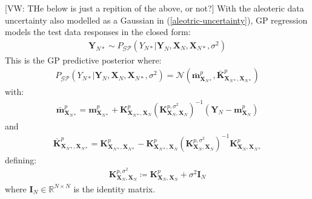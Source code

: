 \documentclass{article}
\newcommand{\vw}[1]{{\color{green} [VW: #1]}}
\newcommand{\GP}{\operatorname{\mathcal{GP}}}
\numberwithin{equation}{section}
\begin{document}
\vw{THe below is just a repition of the above, or not?}
With the aleoteric data uncertainty also modelled as a Gaussian in (\ref{aleotric-uncertainty}), GP regression models the test data responses in the closed form:
\begin{align}
    \mathbf{Y}_{N*} \sim P_{\GP}\left(Y_{N*} \vert \mathbf{Y}_N, \mathbf{X}_N, \mathbf{X}_{N*}, \sigma^2\right)
    \label{gp-posterior}
\end{align}
This is the GP predictive posterior where:
\begin{align}
    P_{\GP}\left(Y_{N*} \vert \mathbf{Y}_N, \mathbf{X}_N, \mathbf{X}_{N*}, \sigma^2\right) = \mathcal{N}\left(\bar{\mathbf{m}}^p_{\mathbf{X}_{N*}}, \bar{\mathbf{K}}^p_{\mathbf{X}_{N*}, \mathbf{X}_{N*}}\right)
    \label{gp-posterior-normal}
\end{align}
with:
\begin{align}
    \label{gp-posterior-mean}
    \bar{\mathbf{m}}^p_{\mathbf{X}_{N*}} = \mathbf{m}^p_{\mathbf{X}_{N*}} + \mathbf{K}^p_{\mathbf{X}_{N*}, \mathbf{X}_N} \left( \mathbf{K}^{p, \sigma^2}_{\mathbf{X}_N, \mathbf{X}_N}\right)^{-1} \left( \mathbf{Y}_N - \mathbf{m}^p_{\mathbf{X}_N}\right)
\end{align}
and
\begin{align}
    \label{gp-posterior-covariance}
    \bar{\mathbf{K}}^p_{\mathbf{X}_{N*}, \mathbf{X}_{N*}} = \mathbf{K}^p_{\mathbf{X}_{N*}, \mathbf{X}_{N*}} - \mathbf{K}^p_{\mathbf{X}_{N*}, \mathbf{X}_N}\left( \mathbf{K}^{p, \sigma^2}_{\mathbf{X}_N, \mathbf{X}_N}\right)^{-1}\mathbf{K}^p_{\mathbf{X}_N, \mathbf{X}_{N*}}
\end{align}
defining:
\begin{align}
    \mathbf{K}^{p, \sigma^2}_{\mathbf{X}_N, \mathbf{X}_N} \coloneqq \mathbf{K}^p_{\mathbf{X}_N, \mathbf{X}_N} + \sigma^2 \mathbf{I}_N
    \label{gp-covariance-with-sigma}
\end{align}
where $\mathbf{I}_N \in \mathbb{R}^{N \times N}$ is the identity matrix.
\end{document}
